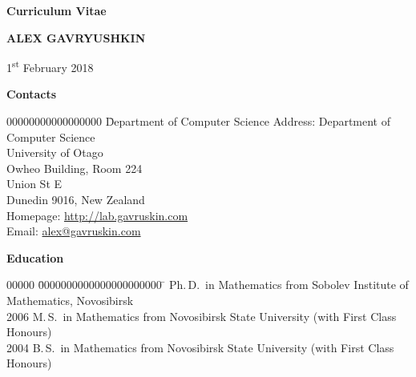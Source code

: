 \documentclass[12pt]{article}
\begin{document}
\centerline{\large \bf Curriculum Vitae}
\vskip5mm
\centerline{\Large \bfseries A\normalsize LEX \Large G\normalsize AVRYUSHKIN}
\vskip5mm
\centerline{1\textsuperscript{st} February 2018}
\vskip5mm

\centerline{\bf Contacts}
\begin{tabbing}
00000000000000000	\= Department of Computer Science	\kill
Address:		\> Department of Computer Science\\
			\> University of Otago\\
			\> Owheo Building, Room 224\\
			 Union St E\\
			\> Dunedin 9016, New Zealand\\
Homepage:		\> \href{http://lab.gavruskin.com}{http://lab.gavruskin.com}\\
Email:			\> \href{mailto:alex@gavruskin.com}{alex@gavruskin.com}
\end{tabbing}

\centerline{\bf Education}
\begin{tabbing}
00000	\= 0000000000000000000000	\=		\> Ph.\,D.\ in Mathematics	\> from Sobolev Institute of Mathematics, Novosibirsk\\
2006	\> M.\,S.\ in Mathematics	\> from Novosibirsk State University (with First Class Honours)\\
2004	\> B.\,S.\ in Mathematics	\> from Novosibirsk State University (with First Class Honours)
\end{tabbing}
\end{document}
